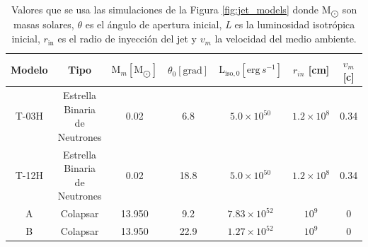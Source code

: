 \documentclass[12pt,a4paper]{book}
\begin{document}
\begin{table}
  \begin{center}
    \begin{tabular}{ c c c c c c c} 
      \hline
      Modelo & Tipo                          & $\text{M}_{m} [\text{M}_{\bigodot}]$  & $\theta_0 [\text{grad}]$ & $\text{L}_{\text{iso},0}  [\text{erg}\,s^{-1}]$ & $r_{in} $ [cm]             & $v_m$ [c]               \\
      \hline
      T-03H  & Estrella Binaria de Neutrones & 0.02                                  &    6.8                   &               $5.0   \times 10^{50}$            &     $1.2 \times 10^8$      &   0.34  \\ 
      T-12H  & Estrella Binaria de Neutrones & 0.02                                  &    18.8                  &               $5.0   \times 10^{50}$            &     $1.2 \times 10^8$      &   0.34  \\ 
      A      & Colapsar                      & 13.950                                &    9.2                   &               $7.83  \times 10^{52}$            &     $10^9$                 &       0                 \\ 
      B      & Colapsar                      & 13.950                                &    22.9                  &               $1.27  \times 10^{52}$            &     $10^9$                 &       0                 \\ 
    \end{tabular}
  \caption{Valores que se usa las simulaciones de la Figura \ref{fig:jet_models} donde $\text{M}_{\bigodot}$ son masas solares, $\theta$ es el ángulo de apertura inicial, \emph{L} es la luminosidad isotrópica inicial,
  $r_{\text{in}}$ es el radio de inyección del jet y $v_m$ la velocidad del medio ambiente.} \label{table:jet_models}
  \end{center}
\end{table}
\end{document}
